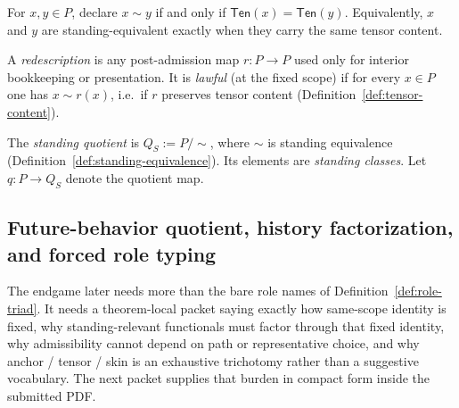 \begin{definition}\label{def:standing-equivalence}
For $x,y\in P$, declare $x\sim y$ if and only if $\mathsf{Ten}(x)=\mathsf{Ten}(y)$.
Equivalently, $x$ and $y$ are standing-equivalent exactly when they carry the same tensor content.
\end{definition}

\begin{definition}\label{def:lawful-redescription}
A \emph{redescription} is any post-admission map $r:P\to P$ used only for interior bookkeeping or
presentation.
It is \emph{lawful} (at the fixed scope) if for every $x\in P$ one has $x\sim r(x)$, i.e.\ if $r$
preserves tensor content (Definition~\ref{def:tensor-content}).
\end{definition}

\begin{definition}\label{def:standing-quotient}
The \emph{standing quotient} is $Q_S:=P/{\sim}$, where $\sim$ is standing equivalence
(Definition~\ref{def:standing-equivalence}).
Its elements are \emph{standing classes}. Let $q:P\to Q_S$ denote the quotient map.
\end{definition}


\subsection{Future-behavior quotient, history factorization, and forced role typing}\label{subsec:future-behavior-ats-packet}
The endgame later needs more than the bare role names of Definition~\ref{def:role-triad}. It needs a theorem-local packet saying exactly how same-scope identity is fixed, why standing-relevant functionals must factor through that fixed identity, why admissibility cannot depend on path or representative choice, and why anchor / tensor / skin is an exhaustive trichotomy rather than a suggestive vocabulary. The next packet supplies that burden in compact form inside the submitted PDF.

